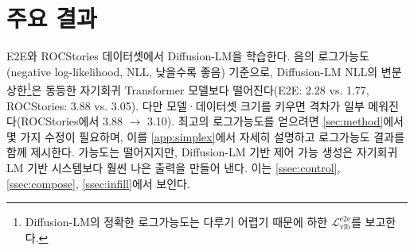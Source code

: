 \documentclass{article}
\begin{document}
\section{주요 결과}
E2E와 ROCStories 데이터셋에서 Diffusion-LM을 학습한다.
음의 로그가능도(negative log-likelihood, NLL, 낮을수록 좋음) 기준으로, Diffusion-LM NLL의 변분 상한\footnote{Diffusion-LM의 정확한 로그가능도는 다루기 어렵기 때문에 하한 $\mathcal{L}^\text{e2e}_{\text{vlb}}$를 보고한다.}은 동등한 자기회귀 Transformer 모델보다 떨어진다(E2E: 2.28 vs. 1.77, ROCStories: 3.88 vs. 3.05). 다만 모델·데이터셋 크기를 키우면 격차가 일부 메워진다(ROCStories에서 3.88 $\xrightarrow{}$ 3.10).
최고의 로그가능도를 얻으려면 \cref{sec:method}에서 몇 가지 수정이 필요하며, 이를 \cref{app:simplex}에서 자세히 설명하고 로그가능도 결과를 함께 제시한다.
가능도는 떨어지지만, Diffusion-LM 기반 제어 가능 생성은 자기회귀 LM 기반 시스템보다 훨씬 나은 출력을 만들어 낸다. 이는 \cref{ssec:control}, \cref{ssec:compose}, \cref{ssec:infill}에서 보인다.

\newcommand{\fluency}{lm $\downarrow$}
\newcommand{\success}{ctrl $\uparrow$}
\end{document}

